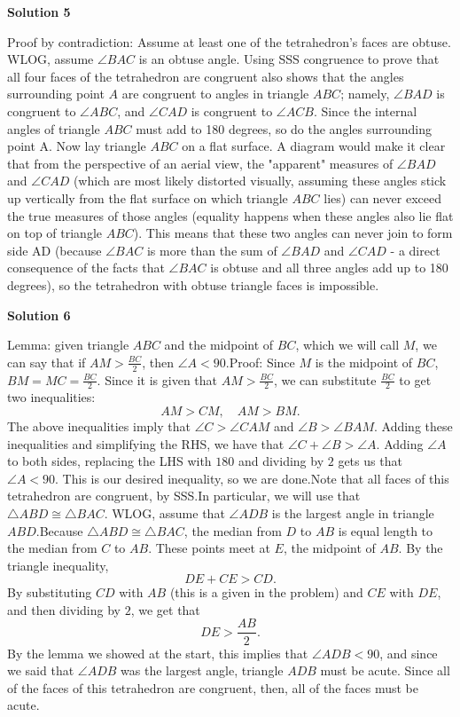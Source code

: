 \begin{enumerate}
 



\textbf{Solution 5}

Proof by contradiction: Assume at least one of the tetrahedron's faces are obtuse. WLOG, assume $\angle BAC$ is an obtuse angle. Using SSS congruence to prove that all four faces of the tetrahedron are congruent also shows that the angles surrounding point $A$ are congruent to angles in triangle $ABC$; namely, $\angle BAD$ is congruent to $\angle ABC$, and $\angle CAD$ is congruent to $\angle ACB$. Since the internal angles of triangle $ABC$ must add to 180 degrees, so do the angles surrounding point A. Now lay triangle $ABC$ on a flat surface. A diagram would make it clear that from the perspective of an aerial view, the "apparent" measures of $\angle BAD$ and $\angle CAD$ (which are most likely distorted visually, assuming these angles stick up vertically from the flat surface on which triangle $ABC$ lies) can never exceed the true measures of those angles (equality happens when these angles also lie flat on top of triangle $ABC$). This means that these two angles can never join to form side AD (because $\angle BAC$ is more than the sum of $\angle BAD$ and $\angle CAD$ - a direct consequence of the facts that $\angle BAC$ is obtuse and all three angles add up to 180 degrees), so the tetrahedron with obtuse triangle faces is impossible.

 



\textbf{Solution 6}

Lemma: given triangle $ABC$ and the midpoint of $BC$, which we will call $M$, we can say that if $AM > \frac{BC}{2}$, then $\angle A < 90$.Proof: Since $M$ is the midpoint of $BC$, $BM = MC = \frac{BC}{2}$. Since it is given that $AM > \frac{BC}{2}$, we can substitute $\frac{BC}{2}$ to get two inequalities:
 \[AM > CM, \quad AM > BM.\]The above inequalities imply that $\angle C > \angle CAM$ and $\angle B > \angle BAM$. Adding these inequalities and simplifying the RHS, we have that $\angle C + \angle B > \angle A$. Adding $\angle A$ to both sides, replacing the LHS with $180$ and dividing by $2$ gets us that $\angle A < 90$. This is our desired inequality, so we are done.Note that all faces of this tetrahedron are congruent, by SSS.In particular, we will use that $\triangle ABD \cong \triangle BAC$. WLOG, assume that $\angle ADB$ is the largest angle in triangle $ABD$.Because $\triangle ABD \cong \triangle BAC$, the median from $D$ to $AB$ is equal length to the median from $C$ to $AB$. These points meet at $E$, the midpoint of $AB$. By the triangle inequality,
 \[DE + CE > CD.\]By substituting $CD$ with $AB$ (this is a given in the problem) and $CE$ with $DE$, and then dividing by $2$, we get that
 \[DE > \frac{AB}{2}.\]By the lemma we showed at the start, this implies that $\angle ADB < 90$, and since we said that $\angle ADB$ was the largest angle, triangle $ADB$ must be acute. Since all of the faces of this tetrahedron are congruent, then, all of the faces must be acute.


\end{enumerate}
